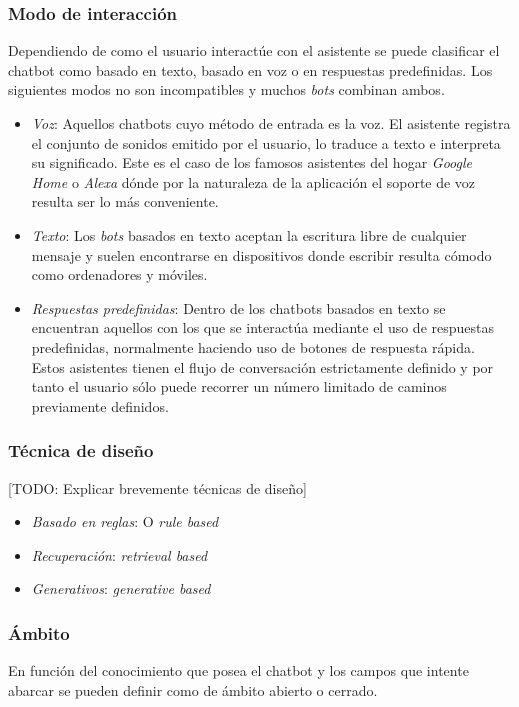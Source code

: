 \subsubsection{Modo de interacción}
Dependiendo de como el usuario interactúe con el asistente se puede clasificar el chatbot como basado en texto, basado en voz o en respuestas predefinidas. Los siguientes modos no son incompatibles y muchos \textit{bots} combinan ambos.


\begin{itemize}
	\item \textit{Voz}: Aquellos chatbots cuyo método de entrada es la voz. El asistente registra el conjunto de sonidos emitido por el usuario, lo traduce a texto e interpreta su significado. Este es el caso de los famosos asistentes del hogar \textit{Google Home} o \textit{Alexa} dónde por la naturaleza de la aplicación el soporte de voz resulta ser lo más conveniente.
	\item \textit{Texto}: Los \textit{bots} basados en texto aceptan la escritura libre de cualquier mensaje y suelen encontrarse en dispositivos donde escribir resulta cómodo como ordenadores y móviles.
	\item \textit{Respuestas predefinidas}: Dentro de los chatbots basados en texto se encuentran aquellos con los que se interactúa mediante el uso de respuestas predefinidas, normalmente haciendo uso de botones de respuesta rápida. Estos asistentes tienen el flujo de conversación estrictamente definido y por tanto el usuario sólo puede recorrer un número limitado de caminos previamente definidos.
\end{itemize}



\subsubsection{Técnica de diseño}
[TODO: Explicar brevemente técnicas de diseño]
\begin{itemize}
	\item \textit{Basado en reglas}: O \textit{rule based}
	\item \textit{Recuperación}: \textit{retrieval based}
	\item \textit{Generativos}: \textit{generative based} 
\end{itemize}

\subsubsection{Ámbito}
En función del conocimiento que posea el chatbot y los campos que intente abarcar se pueden definir como de ámbito abierto o cerrado.

